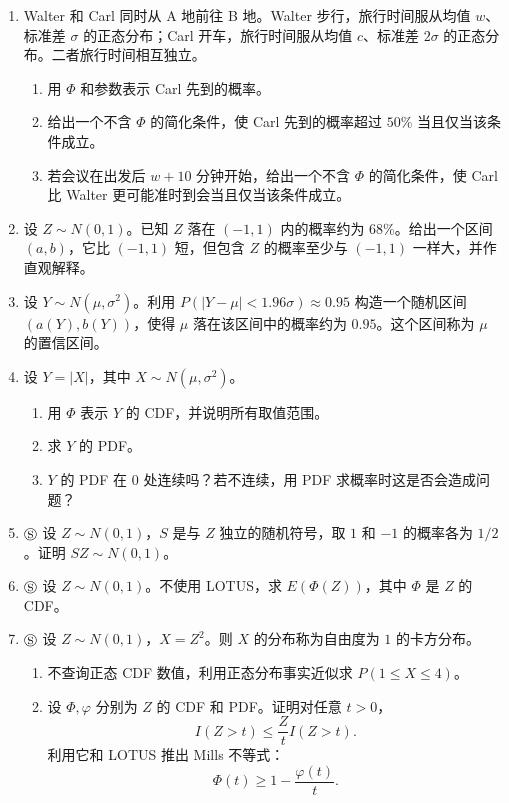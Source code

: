 \documentclass[UTF8,12pt,a4paper,fontset=fandol]{ctexart}
\begin{document}
\begin{enumerate}
  \item Walter 和 Carl 同时从 A 地前往 B 地。Walter 步行，旅行时间服从均值 $w$、标准差 $\sigma$ 的正态分布；Carl 开车，旅行时间服从均值 $c$、标准差 $2\sigma$ 的正态分布。二者旅行时间相互独立。
  \begin{enumerate}
    \item 用 $\Phi$ 和参数表示 Carl 先到的概率。
    \item 给出一个不含 $\Phi$ 的简化条件，使 Carl 先到的概率超过 $50\%$ 当且仅当该条件成立。
    \item 若会议在出发后 $w+10$ 分钟开始，给出一个不含 $\Phi$ 的简化条件，使 Carl 比 Walter 更可能准时到会当且仅当该条件成立。
  \end{enumerate}

  \item 设 $Z\sim N(0,1)$。已知 $Z$ 落在 $(-1,1)$ 内的概率约为 $68\%$。给出一个区间 $(a,b)$，它比 $(-1,1)$ 短，但包含 $Z$ 的概率至少与 $(-1,1)$ 一样大，并作直观解释。

  \item 设 $Y\sim N(\mu,\sigma^2)$。利用 $P(|Y-\mu|<1.96\sigma)\approx0.95$ 构造一个随机区间 $(a(Y),b(Y))$，使得 $\mu$ 落在该区间中的概率约为 $0.95$。这个区间称为 $\mu$ 的置信区间。

  \item 设 $Y=|X|$，其中 $X\sim N(\mu,\sigma^2)$。
  \begin{enumerate}
    \item 用 $\Phi$ 表示 $Y$ 的 CDF，并说明所有取值范围。
    \item 求 $Y$ 的 PDF。
    \item $Y$ 的 PDF 在 $0$ 处连续吗？若不连续，用 PDF 求概率时这是否会造成问题？
  \end{enumerate}

  \item $\circledS$ 设 $Z\sim N(0,1)$，$S$ 是与 $Z$ 独立的随机符号，取 $1$ 和 $-1$ 的概率各为 $1/2$。证明 $SZ\sim N(0,1)$。

  \item $\circledS$ 设 $Z\sim N(0,1)$。不使用 LOTUS，求 $E(\Phi(Z))$，其中 $\Phi$ 是 $Z$ 的 CDF。

  \item $\circledS$ 设 $Z\sim N(0,1)$，$X=Z^2$。则 $X$ 的分布称为自由度为 $1$ 的卡方分布。
  \begin{enumerate}
    \item 不查询正态 CDF 数值，利用正态分布事实近似求 $P(1\le X\le4)$。
    \item 设 $\Phi,\varphi$ 分别为 $Z$ 的 CDF 和 PDF。证明对任意 $t>0$，
    \[
      I(Z>t)\le \frac{Z}{t}I(Z>t).
    \]
    利用它和 LOTUS 推出 Mills 不等式：
    \[
      \Phi(t)\ge 1-\frac{\varphi(t)}{t}.
    \]
  \end{enumerate}


\end{enumerate}
\end{document}
